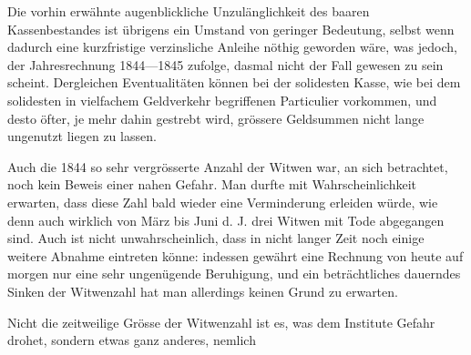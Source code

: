 Die vorhin erwähnte augenblickliche Unzulänglichkeit des baaren Kassenbestandes ist übrigens ein Umstand von geringer Bedeutung, selbst wenn dadurch eine kurzfristige verzinsliche Anleihe nöthig geworden wäre, was jedoch, der Jahresrechnung 1844—1845 zufolge, dasmal nicht der Fall gewesen zu sein scheint. Dergleichen Eventualitäten können bei der solidesten Kasse, wie bei dem solidesten in vielfachem Geldverkehr begriffenen Particulier vorkommen, und desto öfter, je mehr dahin gestrebt wird, grössere Geldsummen nicht lange ungenutzt liegen zu lassen.

Auch die 1844 so sehr vergrösserte Anzahl der Witwen war, an sich betrachtet, noch kein Beweis einer nahen Gefahr. Man durfte mit Wahrscheinlichkeit erwarten, dass diese Zahl bald wieder eine Verminderung erleiden würde, wie denn auch wirklich von März bis Juni d. J. drei Witwen mit Tode abgegangen sind. Auch ist nicht unwahrscheinlich, dass in nicht langer Zeit noch einige weitere Abnahme eintreten könne: indessen gewährt eine Rechnung von heute auf morgen nur eine sehr ungenügende Beruhigung, und ein beträchtliches dauerndes Sinken der Witwenzahl hat man allerdings keinen Grund zu erwarten.

Nicht die zeitweilige Grösse der Witwenzahl ist es, was dem Institute Gefahr drohet, sondern etwas ganz anderes, nemlich
